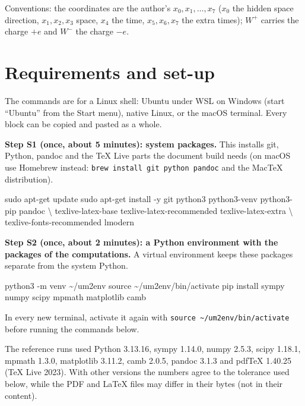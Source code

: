\documentclass[
  10pt,
]{article}
\newenvironment{Shaded}{}{}
\newcommand{\NormalTok}[1]{#1}
\begin{document}
Conventions: the coordinates are the author's \(x_0, x_1, \dots, x_7\)
(\(x_0\) the hidden space direction, \(x_1, x_2, x_3\) space, \(x_4\)
the time, \(x_5, x_6, x_7\) the extra times); \(W^+\) carries the charge
\(+e\) and \(W^-\) the charge \(-e\).

\hypertarget{requirements-and-set-up}{%
\section{Requirements and set-up}\label{requirements-and-set-up}}

The commands are for a Linux shell: Ubuntu under WSL on Windows (start
``Ubuntu'' from the Start menu), native Linux, or the macOS terminal.
Every block can be copied and pasted as a whole.

\textbf{Step S1 (once, about 5 minutes): system packages.} This installs
git, Python, pandoc and the TeX Live parts the document build needs (on
macOS use Homebrew instead: \texttt{brew\ install\ git\ python\ pandoc}
and the MacTeX distribution).

\begin{Shaded}
\begin{Highlighting}[]
\NormalTok{sudo apt{-}get update}
\NormalTok{sudo apt{-}get install {-}y git python3 python3{-}venv python3{-}pip pandoc \textbackslash{}}
\NormalTok{    texlive{-}latex{-}base texlive{-}latex{-}recommended texlive{-}latex{-}extra \textbackslash{}}
\NormalTok{    texlive{-}fonts{-}recommended lmodern}
\end{Highlighting}
\end{Shaded}

\textbf{Step S2 (once, about 2 minutes): a Python environment with the
packages of the computations.} A virtual environment keeps these
packages separate from the system Python.

\begin{Shaded}
\begin{Highlighting}[]
\NormalTok{python3 {-}m venv \textasciitilde{}/um2env}
\NormalTok{source \textasciitilde{}/um2env/bin/activate}
\NormalTok{pip install sympy numpy scipy mpmath matplotlib camb}
\end{Highlighting}
\end{Shaded}

In every new terminal, activate it again with
\texttt{source\ \textasciitilde{}/um2env/bin/activate} before running
the commands below.

The reference runs used Python 3.13.16, sympy 1.14.0, numpy 2.5.3, scipy
1.18.1, mpmath 1.3.0, matplotlib 3.11.2, camb 2.0.5, pandoc 3.1.3 and
pdfTeX 1.40.25 (TeX Live 2023). With other versions the numbers agree to
the tolerance used below, while the PDF and LaTeX files may differ in
their bytes (not in their content).
\end{document}
